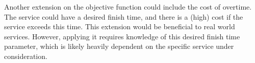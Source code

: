 Another extension on the objective function could include the cost of overtime. The service could have a desired finish time, and there is a (high) cost if the service exceeds this time. This extension would be beneficial to real world services. However, applying it requires knowledge of this desired finish time parameter, which is likely heavily dependent on the specific service under consideration.